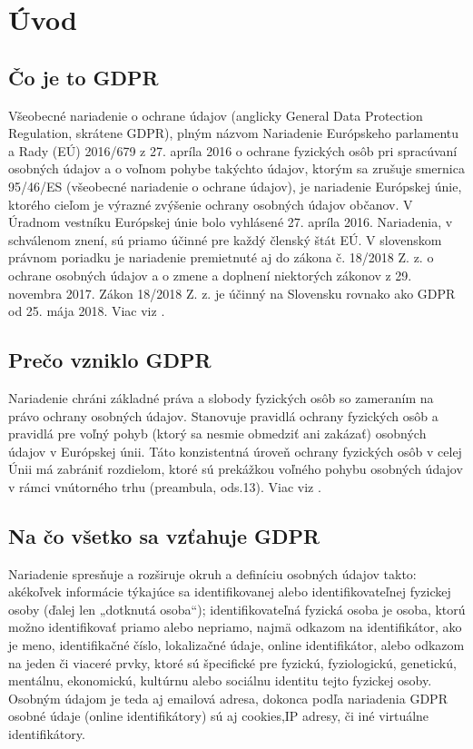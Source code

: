 \chapter{Úvod}
\section{Čo je to GDPR}
Všeobecné nariadenie o ochrane údajov (anglicky General Data Protection Regulation, skrátene GDPR), plným názvom Nariadenie Európskeho parlamentu a Rady (EÚ) 2016/679 z 27. apríla 2016 o ochrane fyzických osôb pri spracúvaní osobných údajov a o voľnom pohybe takýchto údajov, ktorým sa zrušuje smernica 95/46/ES (všeobecné nariadenie o ochrane údajov), je nariadenie Európskej únie, ktorého cieľom je výrazné zvýšenie ochrany osobných údajov občanov. V Úradnom vestníku Európskej únie bolo vyhlásené 27. apríla 2016. Nariadenia, v schválenom znení, sú priamo účinné pre každý členský štát EÚ. V slovenskom právnom poriadku je nariadenie premietnuté aj do zákona č. 18/2018 Z. z. o ochrane osobných údajov a o zmene a doplnení niektorých zákonov z 29. novembra 2017. Zákon 18/2018 Z. z. je účinný na Slovensku rovnako ako GDPR od 25. mája 2018. Viac viz \cite{wikiGDPR}.
\section{Prečo vzniklo GDPR}
Nariadenie chráni základné práva a slobody fyzických osôb so zameraním na právo ochrany osobných údajov. Stanovuje pravidlá ochrany fyzických osôb a pravidlá pre voľný pohyb (ktorý sa nesmie obmedziť ani zakázať) osobných údajov v Európskej únii. Táto konzistentná úroveň ochrany fyzických osôb v celej Únii má zabrániť rozdielom, ktoré sú prekážkou voľného pohybu osobných údajov v rámci vnútorného trhu (preambula, ods.13). Viac viz \cite{wikiGDPR}.
\newpage
\section{Na čo všetko sa vzťahuje GDPR}
Nariadenie spresňuje a rozširuje okruh a definíciu osobných údajov takto: akékoľvek informácie týkajúce sa identifikovanej alebo identifikovateľnej fyzickej osoby (ďalej len „dotknutá osoba“); identifikovateľná fyzická osoba je osoba, ktorú možno identifikovať priamo alebo nepriamo, najmä odkazom na identifikátor, ako je meno, identifikačné číslo, lokalizačné údaje, online identifikátor, alebo odkazom na jeden či viaceré prvky, ktoré sú špecifické pre fyzickú, fyziologickú, genetickú, mentálnu, ekonomickú, kultúrnu alebo sociálnu identitu tejto fyzickej osoby. Osobným údajom je teda aj emailová adresa, dokonca podľa nariadenia GDPR osobné údaje (online identifikátory) sú aj cookies,IP adresy, či iné virtuálne identifikátory.

